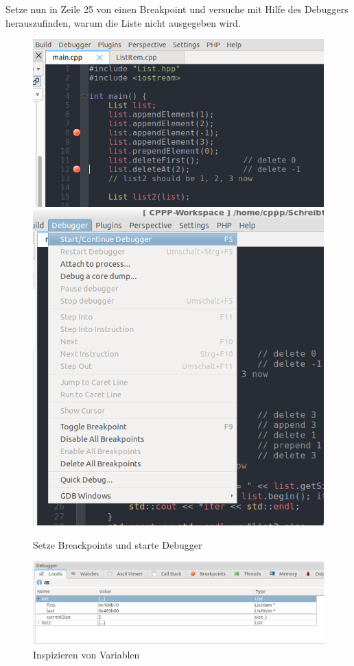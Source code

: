 Setze nun in Zeile 25 von  einen Breakpoint und versuche mit Hilfe des Debuggers herauszufinden, warum die Liste nicht ausgegeben wird.
%
\begin{figure}
	\centering
	\includegraphics[width=.6\textwidth]{02_memory/figures/breakpoints.png}
	\includegraphics[width=.3\textwidth]{02_memory/figures/start_debugger.png}
	\caption{Setze Breackpoints und starte Debugger}
	\label{fig:breakpoints}
\end{figure}


\begin{figure}
	\centering
	\includegraphics[width=.9\textwidth]{02_memory/figures/locals_view.png}
	\caption{Inspizieren von Variablen}
	\label{fig:locals_view}
\end{figure}


